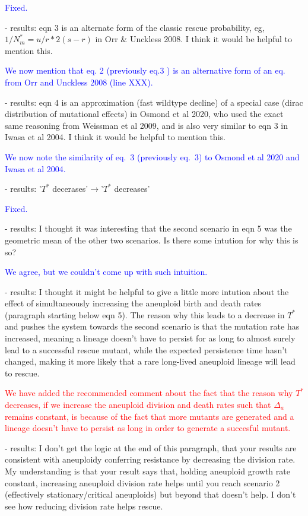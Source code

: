 \documentclass[12pt]{extarticle}
\begin{document}
\textcolor{blue}{Fixed.} %

- results: eqn 3 is an alternate form of the classic rescue probability, eg, $1/N_m^*=u/r*2(s-r)$ in Orr $\&$ Unckless 2008. I think it would be helpful to mention this.

\textcolor{blue}{ %
We now mention that eq. 2 (previously eq.3 ) is an alternative form of an eq. from Orr and Unckless 2008 (line XXX).
} 

- results: eqn 4 is an approximation (fast wildtype decline) of a special case (dirac distribution of mutational effects) in Osmond et al 2020, who used the exact same reasoning from Weissman et al 2009, and is also very similar to eqn 3 in Iwasa et al 2004. I think it would be helpful to mention this.

\textcolor{blue}{%
We now note the similarity of eq.~3 (previously eq.~3) to Osmond et al 2020 and Iwasa et al 2004.
} 

- results: '$T^*$ decerases'$\rightarrow$'$T^*$ decreases'

\textcolor{blue}{Fixed.} %

- results: I thought it was interesting that the second scenario in eqn 5 was the geometric mean of the other two scenarios. Is there some intution for why this is so?

\textcolor{blue}{We agree, but we couldn't come up with such intuition.} 

- results: I thought it might be helpful to give a little more intution about the effect of simultaneously increasing the aneuploid birth and death rates (paragraph starting below eqn 5). The reason why this leads to a decrease in $T^*$ and pushes the system towards the second scenario is that the mutation rate has increased, meaning a lineage doesn't have to persist for as long to almost surely lead to a successful rescue mutant, while the expected persistence time hasn't changed, making it more likely that a rare long-lived aneuploid lineage will lead to rescue.

\textcolor{red}{%
We have added the recommended comment about the fact that the reason why $T^*$ decreases, if we increase the aneuploid division and death rates such that $\Delta_a$ remains constant, is because of the fact that more mutants are generated and a lineage doesn't have to persist as long in order to generate a succesful mutant.
} 

- results: I don't get the logic at the end of this paragraph, that your results are consistent with aneuploidy conferring resistance by decreasing the division rate. My understanding is that your result says that, holding aneuploid growth rate constant, increasing aneuploid division rate helps until you reach scenario 2 (effectively stationary/critical aneuploids) but beyond that doesn't help. I don't see how reducing division rate helps rescue.
\end{document}

